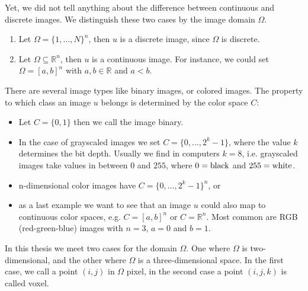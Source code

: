     \begin{remark} %
    \label{rem:continuous_vs_discrete}
        
        Yet, we did not tell anything about the difference between continuous and discrete images. We distinguish these two cases by the image domain $\Omega$.
            \begin{enumerate}
                \item Let $\Omega = \{ 1, ..., N \}^{n}$, then $u$ is a discrete image, since $\Omega$ is discrete.
                \item Let $\Omega \subseteq \mathbb{R}^{n}$, then $u$ is a continuous image. For instance, we could set $\Omega = [a, b]^{n}$ with $a, b \in \mathbb{R}$ and $a < b$.
            \end{enumerate}
        There are several image types like binary images, or colored images. The property to which class an image $u$ belongs is determined by the color space $C$:
            \begin{itemize}
                \item Let $C = \{ 0, 1 \}$ then we call the image binary.
                \item In the case of grayscaled images we set $C = \{ 0, ..., 2^{k}-1 \}$, where the value $k$ determines the bit depth. Usually we find in computers $k = 8$, i.e. grayscaled images take values in between $0$ and $255$, where $0 = \textnormal{black}$ and $255 = \textnormal{white}$.
                \item n-dimensional color images have $C = \{ 0, ..., 2^{k}-1 \}^{n}$, or
                \item as a last example we want to see that an image $u$ could also map to continuous color spaces, e.g. $C = [a, b]^{n}$ or $C = \mathbb{R}^{n}$. Most common are RGB (red-green-blue) images with $n = 3$, $a = 0$ and $b = 1$.
            \end{itemize}

        In this thesis we meet two cases for the domain $\Omega$. One where $\Omega$ is two-dimensional, and the other where $\Omega$ is a three-dimensional space. In the first case, we call a point $(i, j)$ in $\Omega$ pixel, in the second case a point $(i, j, k)$ is called voxel.

    \end{remark}

        
